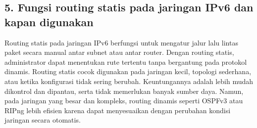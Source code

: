 \subsection*{5. Fungsi routing statis pada jaringan IPv6 dan kapan digunakan}

Routing statis pada jaringan IPv6 berfungsi untuk mengatur jalur lalu lintas paket secara manual antar subnet atau antar router. Dengan routing statis, administrator dapat menentukan rute tertentu tanpa bergantung pada protokol dinamis. Routing statis cocok digunakan pada jaringan kecil, topologi sederhana, atau ketika konfigurasi tidak sering berubah. Keuntungannya adalah lebih mudah dikontrol dan dipantau, serta tidak memerlukan banyak sumber daya. Namun, pada jaringan yang besar dan kompleks, routing dinamis seperti OSPFv3 atau RIPng lebih efisien karena dapat menyesuaikan dengan perubahan kondisi jaringan secara otomatis.



